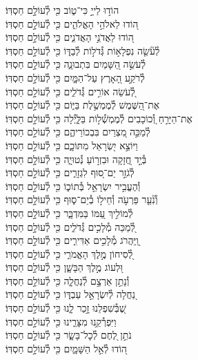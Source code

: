 \documentclass[twoside, openany, parskip=half, 11pt]{book}
\begin{document}
\begin{narrow}
הוֹד֣וּ לַייָ֣ כִּי־ט֑וֹב \hfill
כִּ֖י לְ֯עוֹלָ֣ם חַסְדּֽוֹ׃ \\
ה֭וֹדוּ לֵאלֹהֵ֣י הָאֱלֹהִ֑ים \hfill כִּ֖י לְ֯עוֹלָ֣ם חַסְדּֽוֹ׃ \\
ה֭וֹדוּ לַאֲדֹנֵ֣י הָאֲדֹנִ֑ים \hfill כִּ֖י לְ֯עוֹלָ֣ם חַסְדּֽוֹ׃ \\
לְ֯עֹ֘שֵׂ֤ה נִפְלָא֣וֹת גְּ֯דֹל֣וֹת לְ֯בַדּ֑וֹ \hfill כִּ֖י לְ֯עוֹלָ֣ם חַסְדּֽוֹ׃ \\
לְ֯עֹשֵׂ֣ה הַ֭שָּׁמַיִם בִּתְבוּנָ֑ה \hfill כִּ֖י לְ֯עוֹלָ֣ם חַסְדּֽוֹ׃ \\
לְ֯רֹקַ֣ע הָ֭אָרֶץ עַל־הַמָּ֑יִם \hfill כִּ֖י לְ֯עוֹלָ֣ם חַסְדּֽוֹ׃ \\
לְ֭֯עֹשֵׂה אוֹרִ֣ים גְּ֯דֹלִ֑ים \hfill כִּ֖י לְ֯עוֹלָ֣ם חַסְדּֽוֹ׃ \\
אֶת־הַ֭שֶּׁמֶשׁ לְ֯מֶמְשֶׁ֣לֶת בַּיּ֑וֹם \hfill כִּ֖י לְ֯עוֹלָ֣ם חַסְדּֽוֹ׃ \\
אֶת־הַיָּרֵ֣חַ וְ֭֯כוֹכָבִים לְ֯מֶמְשְׁ֯ל֣וֹת בַּלָּ֑יְ֯לָה \hfill כִּ֖י לְ֯עוֹלָ֣ם חַסְדּֽוֹ׃ \\
לְ֯מַכֵּ֣ה מִ֭צְרַיִם בִּבְכוֹרֵיהֶ֑ם \hfill כִּ֖י לְ֯עוֹלָ֣ם חַסְדּֽוֹ׃ \\
וַיּוֹצֵ֣א יִ֭שְׂרָאֵל מִתּוֹכָ֑ם \hfill כִּ֖י לְ֯עוֹלָ֣ם חַסְדּֽוֹ׃ \\
בְּ֯יָ֣ד חֲ֭זָקָה וּבִזְר֣וֹעַ נְ֯טוּיָ֑ה \hfill כִּ֖י לְ֯עוֹלָ֣ם חַסְדּֽוֹ׃ \\
לְ֯גֹזֵ֣ר יַם־ס֭וּף לִגְזָרִ֑ים \hfill כִּ֖י לְ֯עוֹלָ֣ם חַסְדּֽוֹ׃ \\
וְ֯הֶעֱבִ֣יר יִשְׂרָאֵ֣ל בְּ֯תוֹכ֑וֹ \hfill כִּ֖י לְ֯עוֹלָ֣ם חַסְדּֽוֹ׃ \\
וְ֯נִ֘עֵ֤ר פַּרְעֹ֣ה וְ֯חֵיל֣וֹ בְ֯יַם־ס֑וּף \hfill כִּ֖י לְ֯עוֹלָ֣ם חַסְדּֽוֹ׃ \\
לְ֯מוֹלִ֣יךְ עַ֭מּוֹ בַּמִּדְבָּ֑ר \hfill כִּ֖י לְ֯עוֹלָ֣ם חַסְדּֽוֹ׃ \\
לְ֭֯מַכֵּה מְ֯לָכִ֣ים גְּ֯דֹלִ֑ים \hfill כִּ֖י לְ֯עוֹלָ֣ם חַסְדּֽוֹ׃ \\
וַֽ֭יַּהֲרֹג מְ֯לָכִ֣ים אַדִּירִ֑ים \hfill כִּ֖י לְ֯עוֹלָ֣ם חַסְדּֽוֹ׃ \\
לְ֭֯סִיחוֹן מֶ֣לֶךְ הָאֱמֹרִ֑י \hfill כִּ֖י לְ֯עוֹלָ֣ם חַסְדּֽוֹ׃ \\
וּ֭לְעוֹג מֶ֣לֶךְ הַבָּשָׁ֑ן \hfill כִּ֖י לְ֯עוֹלָ֣ם חַסְדּֽוֹ׃ \\
וְ֯נָתַ֣ן אַרְצָ֣ם לְ֯נַחֲלָ֑ה \hfill כִּ֖י לְ֯עוֹלָ֣ם חַסְדּֽוֹ׃ \\
נַ֭חֲלָה לְ֯יִשְׂרָאֵ֣ל עַבְדּ֑וֹ \hfill כִּ֖י לְ֯עוֹלָ֣ם חַסְדּֽוֹ׃ \\
שֶׁ֭בְּ֯שִׁפְלֵנוּ זָ֣כַר לָ֑נוּ \hfill כִּ֖י לְ֯עוֹלָ֣ם חַסְדּֽוֹ׃ \\
וַיִּפְרְ֯קֵ֥נוּ מִצָּרֵ֑ינוּ \hfill כִּ֖י לְ֯עוֹלָ֣ם חַסְדּֽוֹ׃ \\
נֹתֵ֣ן לֶ֭חֶם לְ֯כׇל־בָּשָׂ֑ר \hfill כִּ֖י לְ֯עוֹלָ֣ם חַסְדּֽוֹ׃ \\
ה֭וֹדוּ לְ֯אֵ֣ל הַשָּׁמָ֑יִם \hfill כִּ֖י לְ֯עוֹלָ֣ם חַסְדּֽוֹ׃ \\




\end{narrow}
\end{document}
